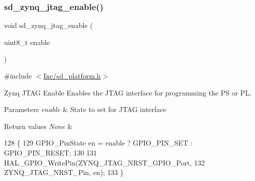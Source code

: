 \subsubsection{\texorpdfstring{sd\+\_\+zynq\+\_\+jtag\+\_\+enable()}{sd\_zynq\_jtag\_enable()}}
{\footnotesize\ttfamily void sd\+\_\+zynq\+\_\+jtag\+\_\+enable (\begin{DoxyParamCaption}\item[{uint8\+\_\+t}]{enable }\end{DoxyParamCaption})}



{\ttfamily \#include $<$\mbox{\hyperlink{sd__platform_8h}{Inc/sd\+\_\+platform.\+h}}$>$}



Zynq J\+T\+AG Enable Enables the J\+T\+AG interface for programming the PS or PL. 


\begin{DoxyParams}{Parameters}
{\em enable} & State to set for J\+T\+AG interface \\
\hline
\end{DoxyParams}

\begin{DoxyRetVals}{Return values}
{\em None} & \\
\hline
\end{DoxyRetVals}

\begin{DoxyCode}
128 \{
129     GPIO\_PinState en = enable ? GPIO\_PIN\_SET : GPIO\_PIN\_RESET;
130 
131     HAL\_GPIO\_WritePin(ZYNQ\_JTAG\_NRST\_GPIO\_Port, 
132               ZYNQ\_JTAG\_NRST\_Pin, en);
133 \}
\end{DoxyCode}
